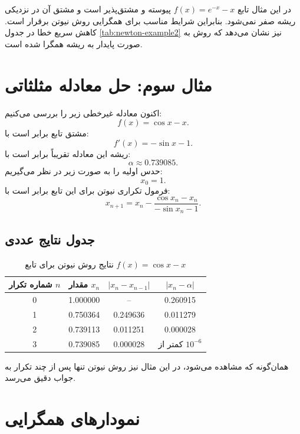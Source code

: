 در این مثال تابع $f(x)=e^{-x}-x$ پیوسته و مشتق‌پذیر است و مشتق آن در نزدیکی ریشه صفر نمی‌شود. بنابراین شرایط مناسب برای همگرایی روش نیوتن برقرار است. کاهش سریع خطا در جدول \ref{tab:newton-example2} نیز نشان می‌دهد که روش به صورت پایدار به ریشه همگرا شده است.

\section{مثال سوم: حل معادله مثلثاتی}

اکنون معادله غیرخطی زیر را بررسی می‌کنیم:
\begin{equation}
f(x)=\cos x - x.
\label{eq:ch4-ex3-func}
\end{equation}
مشتق تابع برابر است با:
\begin{equation}
f'(x)=-\sin x-1.
\label{eq:ch4-ex3-deriv}
\end{equation}
ریشه این معادله تقریباً برابر است با:
\[
\alpha \approx 0.739085.
\]
حدس اولیه را به صورت زیر در نظر می‌گیریم:
\[
x_0=1.
\]
فرمول تکراری نیوتن برای این تابع برابر است با:
\begin{equation}
x_{n+1}
=
x_n-\frac{\cos x_n-x_n}{-\sin x_n-1}.
\label{eq:ch4-ex3-newton}
\end{equation}

\subsection{جدول نتایج عددی}

\begin{table}[H]
\centering
\caption{نتایج روش نیوتن برای تابع $f(x)=\cos x-x$}
\label{tab:newton-example3}
\renewcommand{\arraystretch}{1.35}
\begin{tabular}{c c c c}
\toprule[1.3pt]
شماره تکرار $n$ & مقدار $x_n$ & $|x_n-x_{n-1}|$ & $|x_n-\alpha|$ \\
\midrule[1pt]
0 & 1.000000 & -- & 0.260915 \\
1 & 0.750364 & 0.249636 & 0.011279 \\
2 & 0.739113 & 0.011251 & 0.000028 \\
3 & 0.739085 & 0.000028 & کمتر از $10^{-6}$ \\
\bottomrule[1.3pt]
\end{tabular}
\end{table}

همان‌گونه که مشاهده می‌شود، در این مثال نیز روش نیوتن تنها پس از چند تکرار به جواب دقیق می‌رسد.

\section{نمودارهای همگرایی}
\label{sec:plots}

